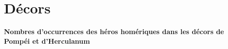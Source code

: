 \documentclass[14pt]{these}
\begin{document}
\part{D\'ecors}
\newcommand{\decor}[2][]{
  \setkeys{bdd}{#1}
  \centering
  \texttt{[image: \#2]}

  \BDDhouse\\
  \BDDname\\
  \textbf{Sujet:} \BDDsubject\\
  \textbf{Type:} \BDDtype\\ 
  \textbf{Datation:} \BDDdate\\ 
  \textbf{Pi\`ece, paroi:}\BDDroom, \BDDwall\\
  \textbf{Artiste:}\BDDartist\\ 
  \textbf{Localisation actuelle:}\BDDlocation\\
  \textbf{Cr\'edits photographiques:} \BDDcredits

  \clearpage
}


\subsection*{Nombres d'occurrences des héros homériques dans les décors de Pompéi
et d'Herculanum}
\end{document}
